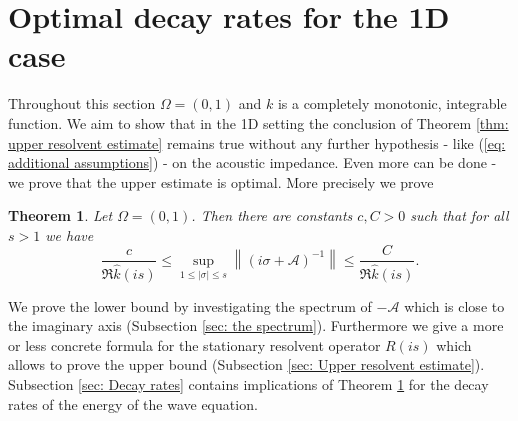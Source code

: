 \documentclass{amsart}
\newcommand{\abs}[1]{\left|#1\right|}
\newcommand{\norm}[1]{\left\| #1 \right\|}
\newcommand{\A}{\mathcal{A}}
\newcommand{\khat}{\hat{k}}
\newtheorem{Theorem}{Theorem}
\begin{document}
\section{Optimal decay rates for the 1D case}\label{sec: 1D case}
Throughout this section $\Omega=(0,1)$ and $k$ is a completely monotonic, integrable function. We aim to show that in the 1D setting the conclusion of Theorem \ref{thm: upper resolvent estimate} remains true without any further hypothesis - like (\ref{eq: additional assumptions}) - on the acoustic impedance. Even more can be done - we prove that the upper estimate is optimal. More precisely we prove
\begin{Theorem}\label{thm: optimal resolvent estimate 1D}
 Let $\Omega=(0,1)$. Then there are constants $c,C>0$ such that for all $s>1$ we have
 \begin{equation}\nonumber
  \frac{c}{\Re\khat(is)} \leq \sup_{1\leq\abs{\sigma}\leq s} \norm{(i\sigma+\A)^{-1}} \leq \frac{C}{\Re\khat(is)}.
\end{equation}
\end{Theorem}
We prove the lower bound by investigating the spectrum of $-\A$ which is close to the imaginary axis (Subsection \ref{sec: the spectrum}). Furthermore we give a more or less concrete formula for the stationary resolvent operator $R(is)$ which allows to prove the upper bound (Subsection \ref{sec: Upper resolvent estimate}). Subsection \ref{sec: Decay rates} contains implications of Theorem \ref{thm: optimal resolvent estimate 1D} for the decay rates of the energy of the wave equation.
\end{document}
